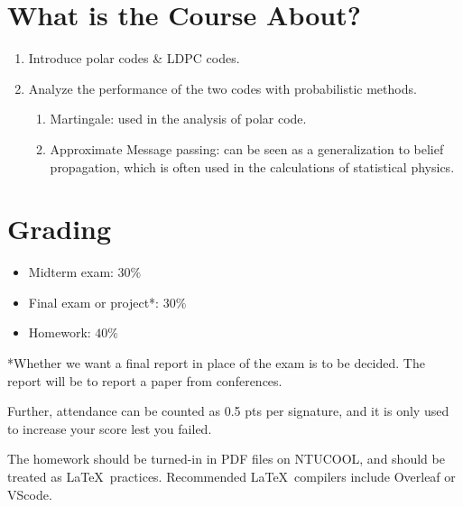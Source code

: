 \section{What is the Course About?}
\begin{enumerate}
    \item Introduce polar codes \& LDPC codes.
    \item Analyze the performance of the two codes with probabilistic methods.
    \begin{enumerate}[label=(\roman*)]
        \item Martingale: used in the analysis of polar code.
        \item Approximate Message passing: can be seen as a generalization to belief propagation, which is often used in the calculations of statistical physics.
    \end{enumerate}
\end{enumerate}

\section{Grading}
\begin{itemize}
    \item Midterm exam: $30\%$
    \item Final exam or project*: $30\%$
    \item Homework: $40\%$
\end{itemize}
*Whether we want a final report in place of the exam is to be decided. The report will be to report a paper from conferences.

Further, attendance can be counted as 0.5 pts per signature, and it is only used to increase your score lest you failed.

The homework should be turned-in in PDF files on NTUCOOL, and should be treated as \LaTeX~practices. Recommended \LaTeX~compilers include Overleaf or VScode.

\newpage

